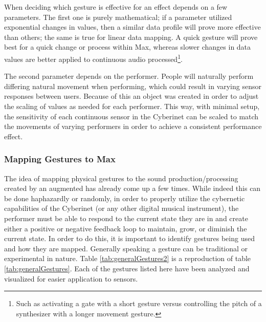 When deciding which gesture is effective for an effect depends on a few parameters. The first one is purely mathematical; if a parameter utilized exponential changes in values, then a similar data profile will prove more effective than others; the same is true for linear data mapping. A quick gesture will prove best for a quick change or process within Max, whereas slower changes in data values are better applied to continuous audio processed\footnote{Such as activating a gate with a short gesture versus controlling the pitch of a synthesizer with a longer movement gesture.}. 

The second parameter depends on the performer. People will naturally perform differing natural movement when performing\cite{wanderleyClarinetGesture2005}, which could result in varying sensor responses between users. Because of this an object was created in order to adjust the scaling of values as needed for each performer. This way, with minimal setup, the sensitivity of each continuous sensor in the Cyberinet can be scaled to match the movements of varying performers in order to achieve a consistent performance effect.

\subsubsection{Mapping Gestures to Max} %

The idea of mapping physical gestures to the sound production/processing created by an augmented has already come up a few times. While indeed this can be done haphazardly or randomly, in order to properly utilize the cybernetic capabilities of the Cyberinet (or any other digital musical instrument), the performer must be able to respond to the current state they are in and create either a positive or negative feedback loop to maintain, grow, or diminish the current state. In order to do this, it is important to identify gestures being used and how they are mapped. Generally speaking a gesture can be traditional or experimental in nature. Table \ref{tab:generalGestures2} is a reproduction of table \ref{tab:generalGestures}. Each of the gestures listed here have been analyzed and visualized for easier application to sensors.


